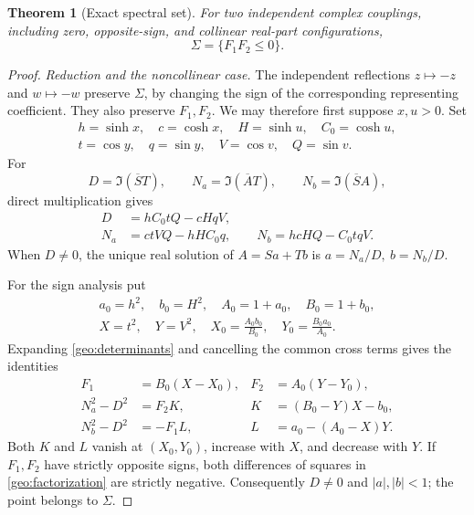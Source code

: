 \documentclass[11pt]{article}
\numberwithin{equation}{section}
\newtheorem{theorem}{Theorem}[section]
\theoremstyle{definition}
\begin{document}
\begin{theorem}[Exact spectral set]\label{geo:exact-sigma}
For two independent complex couplings, including zero, opposite-sign,
and collinear real-part configurations,
\begin{equation}\label{geo:sigma-F}
                         \Sigma=\{F_1F_2\leq0\}.
\end{equation}
\end{theorem}

\begin{proof}
\emph{Reduction and the noncollinear case.}
The independent reflections \(z\mapsto-z\) and \(w\mapsto-w\)
preserve \(\Sigma\), by changing the sign of the corresponding
representing coefficient.  They also preserve \(F_1,F_2\).
We may therefore first suppose \(x,u>0\).  Set
\[
 \begin{gathered}
 h=\sinh x,\quad c=\cosh x,\quad H=\sinh u,\quad C_0=\cosh u,\\
 t=\cos y,\quad q=\sin y,\quad V=\cos v,\quad Q=\sin v.
 \end{gathered}
\]
For
\[
 D=\Im(\overline S T),\qquad
 N_a=\Im(\overline A T),\qquad N_b=\Im(\overline S A),
\]
direct multiplication gives
\begin{align}
 D&=hC_0tQ-cHqV,\nonumber\\
 N_a&=ctVQ-hHC_0q,\qquad
 N_b=hcHQ-C_0tqV. \label{geo:determinants}
\end{align}
When \(D\ne0\), the unique real solution of \(A=Sa+Tb\) is
\(a=N_a/D,\ b=N_b/D\).

For the sign analysis put
\[
 \begin{gathered}
 a_0=h^2,\quad b_0=H^2,\quad A_0=1+a_0,\quad B_0=1+b_0,\\
 X=t^2,\quad Y=V^2,\quad
 X_0=\frac{A_0b_0}{B_0},\quad Y_0=\frac{B_0a_0}{A_0}.
 \end{gathered}
\]
Expanding \eqref{geo:determinants} and cancelling the common cross
terms gives the identities
\begin{align}
 F_1&=B_0(X-X_0),& F_2&=A_0(Y-Y_0),\nonumber\\
 N_a^2-D^2&=F_2K,&K&=(B_0-Y)X-b_0,\label{geo:factorization}\\
 N_b^2-D^2&=-F_1L,&L&=a_0-(A_0-X)Y.\nonumber
\end{align}
Both \(K\) and \(L\) vanish at \((X_0,Y_0)\), increase with
\(X\), and decrease with \(Y\).  If \(F_1,F_2\) have strictly
opposite signs, both differences of squares in
\eqref{geo:factorization} are strictly negative.  Consequently
\(D\ne0\) and \(|a|,|b|<1\); the point belongs to \(\Sigma\).


\end{proof}
\end{document}
